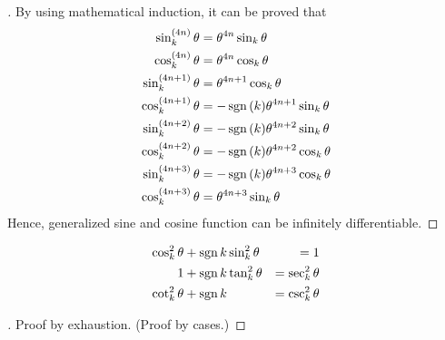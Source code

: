 \documentclass[stu, babel, american, biblatex, a4paper, draftall]{apa7}
\begin{document}
\begin{proof}[]
    By using mathematical induction, it can be proved that
    \begin{align*}
        \sin_k^{\left(4n\right)}\theta   & = \theta^{4n}\sin_k{\theta}                         \\
        \cos_k^{\left(4n\right)}\theta   & = \theta^{4n}\cos_k{\theta}                         \\
        \sin_k^{\left(4n+1\right)}\theta & = \theta^{4n+1}\cos_k{\theta}                       \\
        \cos_k^{\left(4n+1\right)}\theta & = -\operatorname{sgn}{\left(k\right)}\theta^{4n+1}\sin_k{\theta} \\
        \sin_k^{\left(4n+2\right)}\theta & = -\operatorname{sgn}{\left(k\right)}\theta^{4n+2}\sin_k{\theta} \\
        \cos_k^{\left(4n+2\right)}\theta & = -\operatorname{sgn}{\left(k\right)}\theta^{4n+2}\cos_k{\theta} \\
        \sin_k^{\left(4n+3\right)}\theta & = -\operatorname{sgn}{\left(k\right)}\theta^{4n+3}\cos_k{\theta} \\
        \cos_k^{\left(4n+3\right)}\theta & = \theta^{4n+3}\sin_k{\theta}
    \end{align*}
    Hence, generalized sine and cosine function can be infinitely differentiable.
\end{proof}
\begin{theorem}\label{TrigonometryPythagorean}
    \begin{align*}
        \cos_k^2{\theta} & +\operatorname{sgn}{k}\sin_k^2{\theta} & = 1                \\
        1                & +\operatorname{sgn}{k}\tan_k^2{\theta} & = \sec_k^2{\theta} \\
        \cot_k^2{\theta} & +\operatorname{sgn}{k}                 & = \csc_k^2{\theta}
    \end{align*}
\end{theorem}
\begin{proof}[]
    \skipped

    Proof by exhaustion. (Proof by cases.)
\end{proof}
\end{document}
